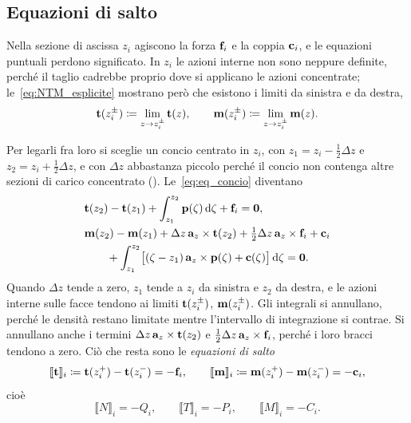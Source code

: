 



\subsection{Equazioni di salto}
\label{sec:salto_singolarita}

Nella sezione di ascissa $z_i$ agiscono la forza $\mathbf{f}_i$
e la coppia $\mathbf{c}_i$, e le equazioni puntuali perdono
significato. In $z_i$ le azioni interne non sono neppure
definite, perché il taglio cadrebbe proprio dove si
applicano le azioni concentrate; le~\eqref{eq:NTM_esplicite}
mostrano però che esistono i limiti da sinistra e da
destra,
\begin{equation*}
	\mathbf{t}(z_i^\pm) \coloneqq \lim_{z \to z_i^\pm} \mathbf{t}(z),
	\qquad
	\mathbf{m}(z_i^\pm) \coloneqq \lim_{z \to z_i^\pm} \mathbf{m}(z).
\end{equation*}

Per legarli fra loro si sceglie un concio centrato in
$z_i$, con $z_1 = z_i - \tfrac{1}{2}\Delta z$ e
$z_2 = z_i + \tfrac{1}{2}\Delta z$, e con $\Delta z$
abbastanza piccolo perché il concio non contenga altre
sezioni di carico concentrato ().
Le~\eqref{eq:eq_concio} diventano
\begin{equation*}
	\begin{aligned}
		&\mathbf{t}(z_2) - \mathbf{t}(z_1)
		+ \int_{z_1}^{z_2} \mathbf{p}(\zeta)\,\mathrm{d}\zeta
		+ \mathbf{f}_i = \mathbf{0},\\
		&\mathbf{m}(z_2) - \mathbf{m}(z_1)
		+ \Delta z\,\mathbf{a}_z \times \mathbf{t}(z_2)
		+ \tfrac{1}{2}\Delta z\,\mathbf{a}_z \times \mathbf{f}_i + \mathbf{c}_i\\
		&\qquad + \int_{z_1}^{z_2}
		\bigl[(\zeta - z_1)\,\mathbf{a}_z \times \mathbf{p}(\zeta) + \mathbf{c}(\zeta)\bigr]\,\mathrm{d}\zeta
		= \mathbf{0}.
	\end{aligned}
\end{equation*}
Quando $\Delta z$ tende a zero, $z_1$ tende a $z_i$ da
sinistra e $z_2$ da destra, e le azioni interne sulle
facce tendono ai limiti $\mathbf{t}(z_i^\pm)$, $\mathbf{m}(z_i^\pm)$.
Gli integrali si annullano,
perché le densità restano limitate mentre l'intervallo di
integrazione si contrae. Si annullano anche i termini
$\Delta z\,\mathbf{a}_z \times \mathbf{t}(z_2)$ e
$\tfrac{1}{2}\Delta z\,\mathbf{a}_z \times \mathbf{f}_i$, perché i loro
bracci tendono a zero. Ciò che resta sono le
\emph{equazioni di salto}
\begin{equation*}
	\llbracket \mathbf{t} \rrbracket_i \coloneqq
	\mathbf{t}(z_i^+) - \mathbf{t}(z_i^-) = -\mathbf{f}_i, \qquad
	\llbracket \mathbf{m} \rrbracket_i \coloneqq
	\mathbf{m}(z_i^+) - \mathbf{m}(z_i^-) = -\mathbf{c}_i,
\end{equation*}
cioè
\begin{equation}\label{eq:salto_NTM}
	\llbracket N \rrbracket_i = -Q_i, \qquad
	\llbracket T \rrbracket_i = -P_i, \qquad
	\llbracket M \rrbracket_i = -C_i.
\end{equation}

